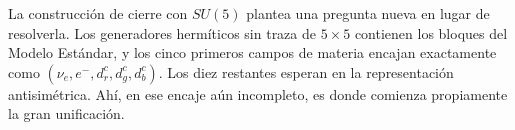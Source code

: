 La construcción de cierre con \(SU(5)\) plantea una pregunta nueva en lugar de resolverla. Los generadores hermíticos sin traza de \(5\times5\) contienen los bloques del Modelo Estándar, y los cinco primeros campos de materia encajan exactamente como \((\nu_e,e^-,d^c_r,d^c_g,d^c_b)\). Los diez restantes esperan en la representación antisimétrica. Ahí, en ese encaje aún incompleto, es donde comienza propiamente la gran unificación.
